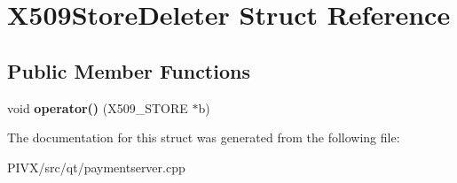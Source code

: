 \hypertarget{struct_x509_store_deleter}{}\section{X509\+Store\+Deleter Struct Reference}
\label{struct_x509_store_deleter}
\subsection*{Public Member Functions}
\begin{DoxyCompactItemize}
\item 
\mbox{\label{struct_x509_store_deleter_aa51f4b04eb2cb5728e83d732f672c363}} 
void {\bfseries operator()} (X509\+\_\+\+S\+T\+O\+RE $\ast$b)
\end{DoxyCompactItemize}


The documentation for this struct was generated from the following file\+:\begin{DoxyCompactItemize}
\item 
P\+I\+V\+X/src/qt/paymentserver.\+cpp\end{DoxyCompactItemize}
